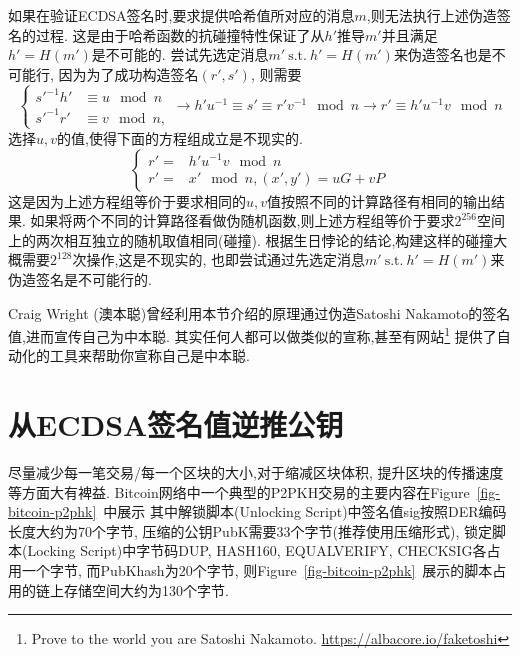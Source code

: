 \documentclass{article}
\begin{document}
如果在验证ECDSA签名时,要求提供哈希值所对应的消息$m$,则无法执行上述伪造签名的过程.
这是由于哈希函数的抗碰撞特性保证了从$h'$推导$m'$并且满足$h'=H(m')$是不可能的.
尝试先选定消息$m'\ \text{s.t.}\ h' = H(m')$来伪造签名也是不可能行, 因为为了成功构造签名$(r', s')$, 则需要
\begin{equation}\nonumber
\left\{
\begin{array}{ll}
s'^{-1}h' & \equiv u \mod n\\
s'^{-1}r' & \equiv v \mod n,
\end{array}
\right.
\rightarrow
h'u^{-1} \equiv s' \equiv r'v^{-1} \mod n
\rightarrow
r' \equiv h'u^{-1}v \mod n
\end{equation}
选择$u,v$的值,使得下面的方程组成立是不现实的.
\begin{equation}\nonumber
\left\{
\begin{array}{ll}
r' = & h'u^{-1}v \mod n\\
r ' = & x' \mod n,  (x', y') = uG + vP
\end{array}
\right.
\end{equation}
这是因为上述方程组等价于要求相同的$u,v$值按照不同的计算路径有相同的输出结果.
如果将两个不同的计算路径看做伪随机函数,则上述方程组等价于要求$2^{256}$空间上的两次相互独立的随机取值相同(碰撞).
根据生日悖论的结论,构建这样的碰撞大概需要$2^{128}$次操作,这是不现实的,
也即尝试通过先选定消息$m'\ \text{s.t.}\ h' = H(m')$来伪造签名是不可能行的.

Craig Wright (澳本聪)曾经利用本节介绍的原理通过伪造Satoshi Nakamoto的签名值,进而宣传自己为中本聪.
其实任何人都可以做类似的宣称,甚至有网站\footnote{
Prove to the world you are Satoshi Nakamoto. \url{https://albacore.io/faketoshi}}
提供了自动化的工具来帮助你宣称自己是中本聪.

\section{从ECDSA签名值逆推公钥}

尽量减少每一笔交易/每一个区块的大小,对于缩减区块体积, 提升区块的传播速度等方面大有裨益.
Bitcoin网络中一个典型的P2PKH交易的主要内容在Figure~\ref{fig-bitcoin-p2phk}~中展示
其中解锁脚本(Unlocking Script)中签名值\textsf{sig}按照DER编码长度大约为70个字节, 
压缩的公钥\textsf{PubK}需要33个字节(推荐使用压缩形式),
锁定脚本(Locking Script)中字节码\textsf{DUP}, \textsf{HASH160}, \textsf{EQUALVERIFY}, \textsf{CHECKSIG}各占用一个字节, 
而\textsf{PubKhash}为20个字节, 则Figure~\ref{fig-bitcoin-p2phk}~展示的脚本占用的链上存储空间大约为130个字节.
\end{document}
